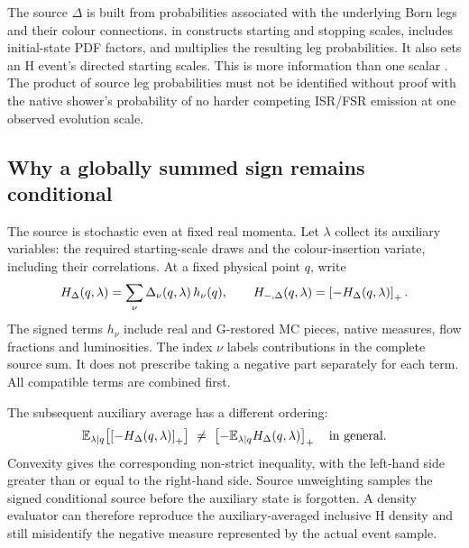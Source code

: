 The source $\Delta$ is built from probabilities associated with the
underlying Born legs and their colour connections.
 in
constructs starting and stopping scales, includes initial-state
PDF factors, and multiplies the resulting leg probabilities.
It also sets an H event's directed starting scales.
This is more information than one scalar .
The product of source leg probabilities must not be identified
without proof with the native shower's probability of no harder
competing ISR/FSR emission at one observed evolution scale.



\subsection{Why a globally summed sign remains conditional}
\label{sec:delta-conditional}

The source is stochastic even at fixed real momenta.
Let $\lambda$ collect its auxiliary variables: the required
starting-scale draws and the colour-insertion variate, including
their correlations. At a fixed physical point $q$, write
\begin{equation}
 H_\Delta(q,\lambda)=
       \sum_\nu \Delta_\nu(q,\lambda)\,h_\nu(q),
 \qquad
 H_{-,\Delta}(q,\lambda)=\left[-H_\Delta(q,\lambda)\right]_+.
 \label{eq:delta-conditional-density}
\end{equation}
The signed terms $h_\nu$ include real and G-restored MC pieces,
native measures, flow fractions and luminosities.
The index $\nu$ labels contributions in the complete source sum.
It does not prescribe taking a negative part separately for each term.
All compatible terms are combined first.

The subsequent auxiliary average has a different ordering:
\begin{equation}
 \mathbb E_{\lambda\mid q}
       \!\left[\left[-H_\Delta(q,\lambda)\right]_+\right]
 \ \ne\
 \left[-\mathbb E_{\lambda\mid q}H_\Delta(q,\lambda)\right]_+
 \quad\hbox{in general}.
 \label{eq:delta-negative-average}
\end{equation}
Convexity gives the corresponding non-strict inequality, with the
left-hand side greater than or equal to the right-hand side.
Source unweighting samples the signed conditional source before
the auxiliary state is forgotten.
A density evaluator can therefore reproduce the auxiliary-averaged
inclusive H density and still misidentify the negative measure
represented by the actual event sample.

